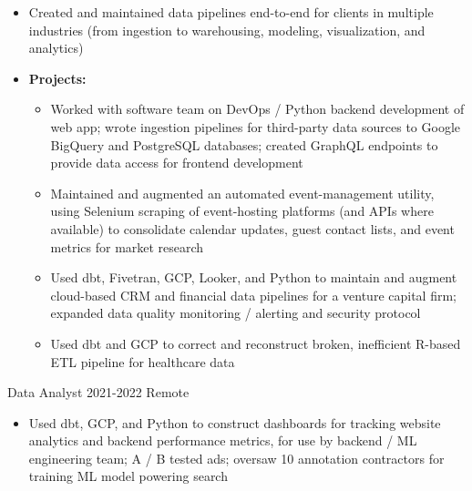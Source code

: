 \documentclass[8pt,a4paper]{altacv}
\begin{document}
                {\begin{itemize}[leftmargin=0pt]
                \renewcommand\labelitemi{}
                    \item Created and maintained data pipelines end-to-end for clients in multiple industries (from ingestion to warehousing, modeling, visualization, and analytics)
                    \vspace{1.5pt}
                    \item {\bfseries\color{emphasis}Projects:}
                        \begin{itemize}[leftmargin=2.25em]
                        \smallskip
                        \item[\raisebox{-2pt}{\color{accent}\Large\faCode}] Worked with software team on DevOps / Python backend development of web app; wrote ingestion pipelines for third-party data sources to Google BigQuery and PostgreSQL databases; created GraphQL endpoints to provide data access for frontend development 
                        \smallskip
                        \item[\raisebox{-2pt}{\color{accent}\Large\faCalendar}] Maintained and augmented an automated event-management utility, using Selenium scraping of event-hosting platforms (and APIs where available) to consolidate calendar updates, guest contact lists, and event metrics for market research
                        \smallskip
                        \item[\raisebox{-2pt}{\color{accent}\Large\faBarChart}] Used dbt, Fivetran, GCP, Looker, and Python to maintain and augment cloud-based CRM and financial data pipelines for a venture capital firm; expanded data quality monitoring / alerting and security protocol
                        \smallskip
                        \item[\raisebox{-2pt}{\color{accent}\Large\faMedkit}] Used dbt and GCP to correct and reconstruct broken, inefficient R-based ETL pipeline for healthcare data
                    \end{itemize}
                \end{itemize}}
            
                {Data Analyst}
                {2021-2022}
                {Remote}
                {\begin{itemize}[leftmargin=0pt]
                \renewcommand\labelitemi{}
                    \item Used dbt, GCP, and Python to construct dashboards for tracking website analytics and backend performance metrics, for use by backend / ML engineering team; A / B tested ads; oversaw 10 annotation contractors for training ML model powering search
                \end{itemize}}
            
\end{document}
